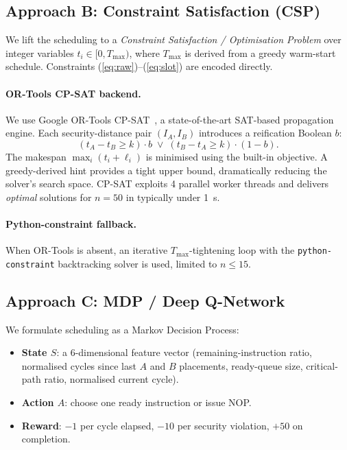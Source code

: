 \documentclass[letterpaper]{article}
\begin{document}
\subsection{Approach B: Constraint Satisfaction (CSP)}

We lift the scheduling to a \emph{Constraint Satisfaction / Optimisation
  Problem} over integer variables $t_i \in [0, T_{\max})$, where
$T_{\max}$ is derived from a greedy warm-start schedule.  Constraints
(\ref{eq:raw})--(\ref{eq:slot}) are encoded directly.

\paragraph{OR-Tools CP-SAT backend.}  We use Google OR-Tools
CP-SAT~\cite{ortools}, a state-of-the-art SAT-based propagation engine.
Each security-distance pair $(I_A, I_B)$ introduces a reification
Boolean $b$:
\begin{equation}
  (t_A - t_B \ge k) \cdot b \;\vee\; (t_B - t_A \ge k) \cdot (1-b).
\end{equation}
The makespan $\max_i(t_i + \ell_i)$ is minimised using the built-in
objective.  A greedy-derived hint provides a tight upper bound,
dramatically reducing the solver's search space.  CP-SAT exploits 4
parallel worker threads and delivers \emph{optimal} solutions for
$n = 50$ in typically under 1~s.

\paragraph{Python-constraint fallback.}  When OR-Tools is absent, an
iterative $T_{\max}$-tightening loop with the \texttt{python-constraint}
backtracking solver is used, limited to $n \le 15$.

\subsection{Approach C: MDP / Deep Q-Network}

We formulate scheduling as a Markov Decision Process:
\begin{itemize}\setlength\itemsep{0pt}
  \item \textbf{State $S$}: a 6-dimensional feature vector
        (remaining-instruction ratio, normalised cycles since last $A$
        and $B$ placements, ready-queue size, critical-path ratio,
        normalised current cycle).
  \item \textbf{Action $A$}: choose one ready instruction or issue NOP.
  \item \textbf{Reward}: $-1$ per cycle elapsed, $-10$ per security
        violation, $+50$ on completion.
\end{itemize}
\end{document}
